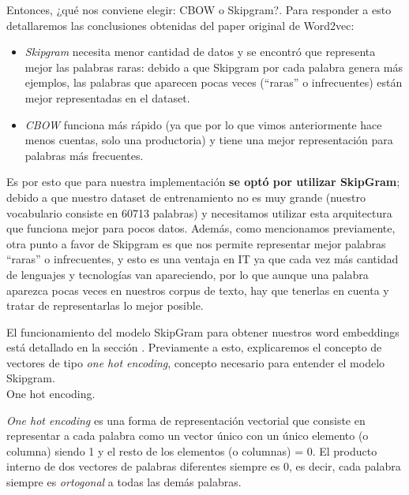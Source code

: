\documentclass[12pt,a4paper]{article}
\makeatletter
\renewcommand\paragraph{\@startsection{paragraph}{4}{\z@}
            {-2.5ex\@plus -1ex \@minus -.25ex}
            {1.25ex \@plus .25ex}
            {\normalfont\normalsize\bfseries}}
\makeatother
\begin{document}
\begin{sloppypar}
\begin{itemize}
\end{itemize}

Entonces, ¿qué nos conviene elegir: CBOW o Skipgram?. Para responder a esto detallaremos las conclusiones obtenidas del paper original de Word2vec\cite{NLP_11}:
\begin{itemize}
\item \textit{Skipgram} necesita menor cantidad de datos y se encontró que representa mejor las palabras raras: debido a que Skipgram por cada palabra genera más ejemplos, las palabras que aparecen pocas veces (“raras” o infrecuentes) están mejor representadas en el dataset. 
\item \textit{CBOW} funciona más rápido (ya que por lo que vimos anteriormente hace menos cuentas, solo una productoria) y tiene una mejor representación para palabras más frecuentes.
\end{itemize}

Es por esto que para nuestra implementación \textbf{se optó por utilizar SkipGram}; debido a que nuestro dataset de entrenamiento no es muy grande (nuestro vocabulario consiste en 60713 palabras) y necesitamos utilizar esta arquitectura que funciona mejor para pocos datos. Además, como mencionamos previamente, otra punto a favor de Skipgram es que {nos permite representar mejor palabras “raras” o infrecuentes}, y esto es una ventaja en IT ya que cada vez más cantidad de lenguajes y tecnologías van apareciendo, por lo que aunque una palabra aparezca pocas veces en nuestros corpus de texto, hay que tenerlas en cuenta y tratar de representarlas lo mejor posible.

El funcionamiento del modelo SkipGram para obtener nuestros word embeddings está detallado en la sección \textit{}. Previamente a esto, explicaremos el concepto de vectores de tipo \textit{one hot encoding}, concepto necesario para entender el modelo Skipgram.
\\

\paragraph{One hot encoding.}\label{one_hot_enc}

\textit{One hot encoding} es una forma de representación vectorial que consiste en representar a cada palabra como un vector único con un único elemento (o columna) siendo 1 y el resto de los elementos (o columnas) = 0. El producto interno de dos vectores de palabras diferentes siempre es 0, es decir, cada palabra siempre es \textit{ortogonal} a todas las demás palabras\cite{NLP_9}.


\end{sloppypar}
\end{document}
